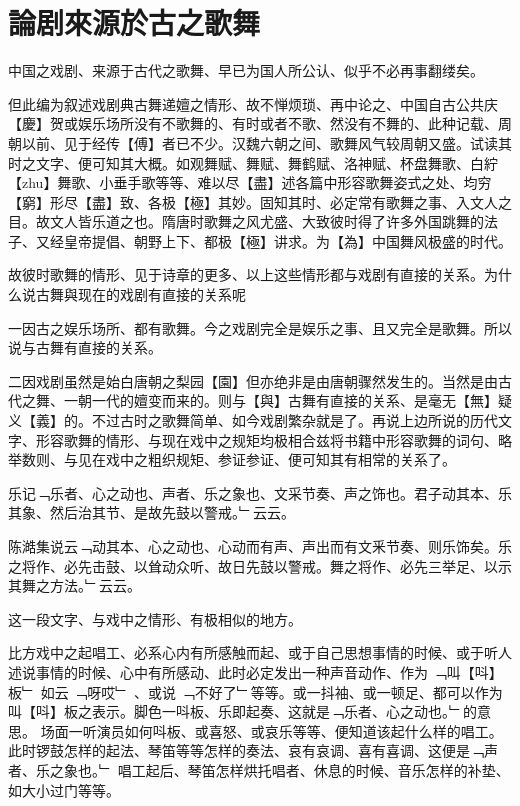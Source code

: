 \chapter*[第一章]{論剧來源於古之歌舞}{}
\begin{preface}
中国之戏剧、来源于古代之歌舞、早已为国人所公认、似乎不必再事翻缕矣。
\end{preface}

但此编为叙述戏剧典古舞递嬗之情形、故不惮烦琐、再中论之、中国自古公共庆【慶】贺或娱乐场所没有不歌舞的、有时或者不歌、然没有不舞的、此种记载、周朝以前、见于经传【傅】者已不少。汉魏六朝之间、歌舞风气较周朝又盛。试读其时之文字、便可知其大概。如观舞赋、舞赋、舞鹤赋、洛神赋、杯盘舞歌、白紵【zhu】舞歌、小垂手歌等等、难以尽【盡】述各篇中形容歌舞姿式之处、均穷【窮】形尽【盡】致、各极【極】其妙。固知其时、必定常有歌舞之事、入文人之目。故文人皆乐道之也。隋唐时歌舞之风尤盛、大致彼时得了许多外国跳舞的法子、又经皇帝提倡、朝野上下、都极【極】讲求。为【為】中国舞风极盛的时代。

故彼时歌舞的情形、见于诗章的更多、以上这些情形都与戏剧有直接的关系。为什么说古舞與现在的戏剧有直接的关系呢

一因古之娱乐场所、都有歌舞。今之戏剧完全是娱乐之事、且又完全是歌舞。所以说与古舞有直接的关系。

二因戏剧虽然是始白唐朝之梨园【園】但亦绝非是由唐朝骤然发生的。当然是由古代之舞、一朝一代的嬗变而来的。则与【與】古舞有直接的关系、是毫无【無】疑义【義】的。不过古时之歌舞简单、如今戏剧繁杂就是了。再说上边所说的历代文字、形容歌舞的情形、与现在戏中之规矩均极相合兹将书籍中形容歌舞的词句、略举数则、与见在戏中之粗织规矩、参证参证、便可知其有相常的关系了。

\begin{preface}
乐记﹁乐者、心之动也、声者、乐之象也、文采节奏、声之饰也。君子动其本、乐其象、然后治其节、是故先鼓以警戒。﹂云云。
\end{preface}

\begin{preface}
陈澔集说云﹁动其本、心之动也、心动而有声、声出而有文釆节奏、则乐饰矣。乐之将作、必先击鼓、以耸动众听、故日先鼓以警戒。舞之将作、必先三举足、以示其舞之方法。﹂云云。
\end{preface}

这一段文字、与戏中之情形、有极相似的地方。

比方戏中之起唱工、必系心内有所感触而起、或于自己思想事情的时候、或于听人述说事情的时候、心中有所感动、此时必定发出一种声音动作、作为 ﹁叫【呌】板﹂ 如云 ﹁呀哎﹂ 、或说 ﹁不好了﹂等等。或一抖袖、或一顿足、都可以作为叫【呌】板之表示。脚色一呌板、乐即起奏、这就是﹁乐者、心之动也。﹂的意思。
场面一听演员如何呌板、或喜怒、或哀乐等等、便知道该起什么样的唱工。此时锣鼓怎样的起法、琴笛等等怎样的奏法、哀有哀调、喜有喜调、这便是﹁声者、乐之象也。﹂ 唱工起后、琴笛怎样烘托唱者、休息的时候、音乐怎样的补垫、如大小过门等等。

